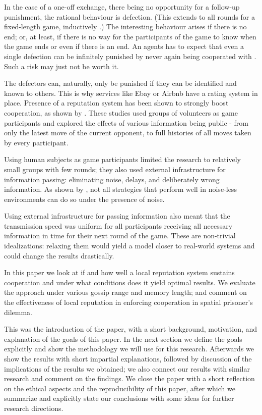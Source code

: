 \documentclass[english]{article}
\begin{document}
In the case of a one-off exchange, there being no opportunity for a follow-up punishment, the rational behaviour is defection. (This extends to all rounds for a fixed-length game, inductively \citep{Axelrod84}.)
The interesting behaviour arises if there is no end; or, at least, if there is no way for the participants of the game to know when the game ends or even if there is an end.
An agents has to expect that even a single defection can be infinitely punished by never again being cooperated with \citep{GRIM}.
Such a risk may just not be worth it.

The defectors can, naturally, only be punished if they can be identified and known to others. This is why services like Ebay or Airbnb have a rating system in place.
Presence of a reputation system has been shown to strongly boost cooperation, as shown by \citet{simple-reputation, public-private-monitoring}.
These studies used groups of volunteers as game participants and explored the effects of various information being public - from only the latest move of the current opponent, to full histories of all moves taken by every participant.

Using human subjects as game participants limited the research to relatively small groups with few rounds; they also used external infrastructure for information passing: eliminating noise, delays, and deliberately wrong information.
As shown by \citet{noise}, not all strategies that perform well in noise-less environments can do so under the presence of noise.

Using external infrastructure for passing information also meant that the transmission speed was uniform for all participants receiving all necessary information in time for their next round of the game.
These are non-trivial idealizations: relaxing them would yield a model closer to real-world systems and could change the results drastically.

In this paper we look at if and how well a local reputation system sustains cooperation and under what conditions does it yield optimal results.
We evaluate the approach under various gossip range and memory length; and comment on the effectiveness of local reputation in enforcing cooperation in spatial prisoner's dilemma.

This was the introduction of the paper, with a short background, motivation, and explanation of the goals of this paper.
In the next section we define the goals explicitly and show the methodology we will use for this research.
Afterwards we show the results with short impartial explanations, followed by discussion of the implications of the results we obtained;
we also connect our results with similar research and comment on the findings.
We close the paper with a short reflection on the ethical aspects and the reproducibility of this paper, after which we summarize and explicitly state our conclusions with some ideas for further research directions.
\end{document}
